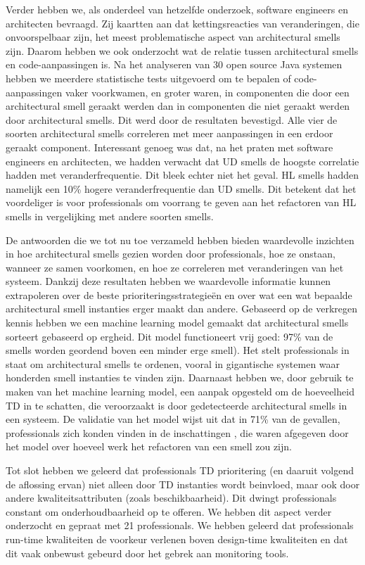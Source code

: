 {Verder hebben we, als onderdeel van hetzelfde onderzoek, software engineers en architecten bevraagd. Zij kaartten aan dat kettingsreacties van veranderingen, die onvoorspelbaar zijn, het meest problematische aspect van architectural smells zijn. Daarom hebben we ook onderzocht wat de relatie tussen architectural smells en code-aanpassingen is. Na het analyseren van 30 open source Java systemen hebben we meerdere statistische tests uitgevoerd om te bepalen of code-aanpassingen vaker voorkwamen, en groter waren, in componenten die door een architectural smell geraakt werden dan in componenten die niet geraakt werden door architectural smells. Dit werd door de resultaten bevestigd. Alle vier de soorten architectural smells correleren met meer aanpassingen in een erdoor geraakt component. Interessant genoeg was dat, na het praten met software engineers en architecten, we hadden verwacht dat UD smells de hoogste correlatie hadden met veranderfrequentie. Dit bleek echter niet het geval. HL smells hadden namelijk een 10\% hogere veranderfrequentie dan UD smells. Dit betekent dat het voordeliger is voor professionals om voorrang te geven aan het refactoren van HL smells in vergelijking met andere soorten smells. 

De antwoorden die we tot nu toe verzameld hebben bieden waardevolle inzichten in hoe architectural smells gezien worden door professionals, hoe ze onstaan, wanneer ze samen voorkomen, en hoe ze correleren met veranderingen van het systeem. Dankzij deze resultaten hebben we waardevolle informatie kunnen extrapoleren over de beste prioriteringsstrategieën en over wat een wat bepaalde architectural smell instanties erger maakt dan andere. Gebaseerd op de verkregen kennis hebben we een machine learning model gemaakt dat architectural smells sorteert gebaseerd op ergheid. Dit model functioneert vrij goed: 97\% van de smells worden geordend boven een minder erge smell). Het stelt professionals in staat om architectural smells te ordenen, vooral in gigantische systemen waar honderden smell instanties te vinden zijn. Daarnaast hebben we, door gebruik te maken van het machine learning model, een aanpak opgesteld om de hoeveelheid TD in te schatten, die veroorzaakt is door gedetecteerde architectural smells in een systeem. De validatie van het model wijst uit dat in 71\% van de gevallen, professionals zich konden vinden in de inschattingen , die waren afgegeven door het model over hoeveel werk het refactoren van een smell zou zijn.

Tot slot hebben we geleerd dat professionals TD prioritering (en daaruit volgend de aflossing ervan) niet alleen door TD instanties wordt beinvloed, maar ook door andere kwaliteitsattributen (zoals beschikbaarheid). Dit dwingt professionals constant om onderhoudbaarheid op te offeren. We hebben dit aspect verder onderzocht en gepraat met 21 professionals. We hebben geleerd dat professionals run-time kwaliteiten de voorkeur verlenen boven design-time kwaliteiten en dat dit vaak onbewust gebeurd door het gebrek aan monitoring tools. 
}
